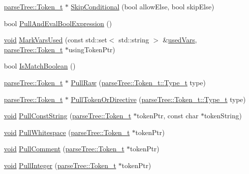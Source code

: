 \begin{DoxyCompactItemize}
\item 
\hyperlink{structparse_tree_1_1_token__t}{parse\+Tree\+::\+Token\+\_\+t} $\ast$ \hyperlink{class_lexer__t_a3890d81517e9c059d5e3b57f5d34f0b1}{Skip\+Conditional} (bool allow\+Else, bool skip\+Else)
\item 
bool \hyperlink{class_lexer__t_a2d1b3b0db5dc5eb040991c27e359f6ae}{Pull\+And\+Eval\+Bool\+Expression} ()
\item 
\hyperlink{_t_e_m_p_l_a_t_e__cdef_8h_ac9c84fa68bbad002983e35ce3663c686}{void} \hyperlink{class_lexer__t_a9ca02eebc0abe9c0877c44772cd59265}{Mark\+Vars\+Used} (const std\+::set$<$ std\+::string $>$ \&\hyperlink{class_lexer__t_a4593954598325485560ea440036c8f65}{used\+Vars}, \hyperlink{structparse_tree_1_1_token__t}{parse\+Tree\+::\+Token\+\_\+t} $\ast$using\+Token\+Ptr)
\item 
bool \hyperlink{class_lexer__t_a9f56b93b06b20371543eee7bc0bb4d90}{Is\+Match\+Boolean} ()
\item 
\hyperlink{structparse_tree_1_1_token__t}{parse\+Tree\+::\+Token\+\_\+t} $\ast$ \hyperlink{class_lexer__t_af4ffafc52240a57fe434512cf57ee5f1}{Pull\+Raw} (\hyperlink{structparse_tree_1_1_token__t_ac0e6319a9ad80509dd4aa1037ba66096}{parse\+Tree\+::\+Token\+\_\+t\+::\+Type\+\_\+t} type)
\item 
\hyperlink{structparse_tree_1_1_token__t}{parse\+Tree\+::\+Token\+\_\+t} $\ast$ \hyperlink{class_lexer__t_ab9e04106b6d238757c3b23f781ea28d5}{Pull\+Token\+Or\+Directive} (\hyperlink{structparse_tree_1_1_token__t_ac0e6319a9ad80509dd4aa1037ba66096}{parse\+Tree\+::\+Token\+\_\+t\+::\+Type\+\_\+t} type)
\item 
\hyperlink{_t_e_m_p_l_a_t_e__cdef_8h_ac9c84fa68bbad002983e35ce3663c686}{void} \hyperlink{class_lexer__t_a271c290aa5212d3b19c5f92307e84964}{Pull\+Const\+String} (\hyperlink{structparse_tree_1_1_token__t}{parse\+Tree\+::\+Token\+\_\+t} $\ast$token\+Ptr, const char $\ast$token\+String)
\item 
\hyperlink{_t_e_m_p_l_a_t_e__cdef_8h_ac9c84fa68bbad002983e35ce3663c686}{void} \hyperlink{class_lexer__t_af053641d6b967e0922bfbd9304e3162c}{Pull\+Whitespace} (\hyperlink{structparse_tree_1_1_token__t}{parse\+Tree\+::\+Token\+\_\+t} $\ast$token\+Ptr)
\item 
\hyperlink{_t_e_m_p_l_a_t_e__cdef_8h_ac9c84fa68bbad002983e35ce3663c686}{void} \hyperlink{class_lexer__t_afad4c713158aa2532ac3864606c4ff52}{Pull\+Comment} (\hyperlink{structparse_tree_1_1_token__t}{parse\+Tree\+::\+Token\+\_\+t} $\ast$token\+Ptr)
\item 
\hyperlink{_t_e_m_p_l_a_t_e__cdef_8h_ac9c84fa68bbad002983e35ce3663c686}{void} \hyperlink{class_lexer__t_a5086073e925e97220e3c359f9ed5e596}{Pull\+Integer} (\hyperlink{structparse_tree_1_1_token__t}{parse\+Tree\+::\+Token\+\_\+t} $\ast$token\+Ptr)

\end{DoxyCompactItemize}
